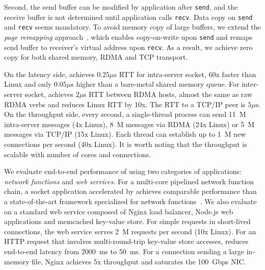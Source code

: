 Second, the send buffer can be modified by application after \texttt{send}, and the receive buffer is not determined until application calls \texttt{recv}. Data copy on \texttt{send} and \texttt{recv} seems mandatory. To avoid memory copy of large buffers, we extend the \textit{page remapping} approach~\cite{thadani1995efficient,chu1996zero}, which enables copy-on-write upon \texttt{send} and remaps send buffer to receiver's virtual address upon \texttt{recv}.
As a result, we achieve zero copy for both shared memory, RDMA and TCP transport.


On the latency side, \sys{} achieves $0.25\mu$s RTT for intra-server socket, 60x faster than Linux and only $0.05\mu$s higher than a bare-metal shared memory queue. For inter-server socket, \sys{} achieves $2\mu$s RTT between RDMA hosts, almost the same as raw RDMA verbs and reduces Linux RTT by 10x. The RTT to a TCP/IP peer is $5\mu$s. On the throughput side, every second, a single-thread process can send 11~M intra-server messages (4x Linux), 8~M messages via RDMA (24x Linux) or 5~M messages via TCP/IP (15x Linux). Each thread can establish up to 1~M new connections per second (40x Linux). It is worth noting that the throughput is scalable with number of cores and connections.

We evaluate end-to-end performance of \sys{} using two categories of applications: \textit{network functions} and \textit{web services}. For a multi-core pipelined network function chain, a socket application accelerated by \sys{} achieves comparable performance than a state-of-the-art framework specialized for network functions~\cite{panda2016netbricks}. We also evaluate \sys{} on a standard web service composed of Nginx load balancer, Node.js web applications and memcached key-value store. For simple requests in short-lived connections, the web service serves 2~M requests per second (10x Linux). For an HTTP request that involves multi-round-trip key-value store accesses, \sys{} reduces end-to-end latency from 2000~ms to 50~ms. For a connection sending a large in-memory file, Nginx achieves 5x throughput and saturates the 100~Gbps NIC.
